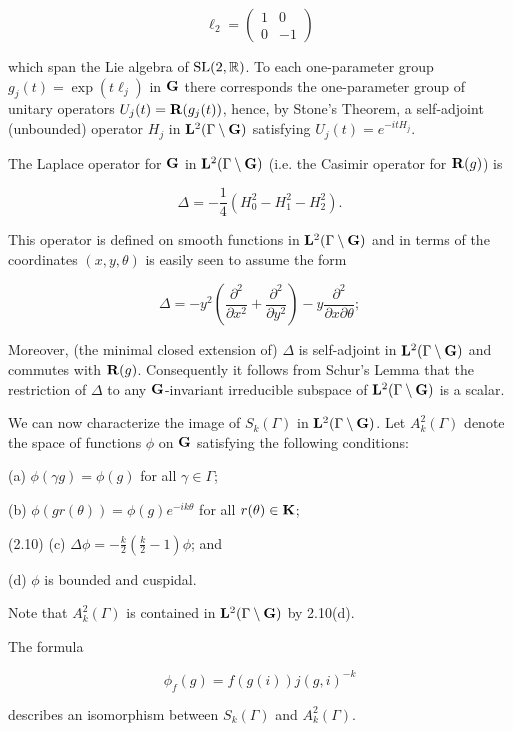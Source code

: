 \[
\ell_2 = \begin{pmatrix} 1 & 0 \\ 0 & -1 \end{pmatrix}
\]

which span the Lie algebra of $\operatorname{SL}(2,\mathbb{R})$. To each one-parameter group $g_j(t) = \exp(t\ell_j)$ in $\mathbf{G}$ there corresponds the one-parameter group of unitary operators $U_j(t) = \mathbf{R}(g_j(t))$, hence, by Stone's Theorem, a self-adjoint (unbounded) operator $H_j$ in $\mathbf{L}^2(\Gamma \setminus \mathbf{G})$ satisfying $U_j(t) = e^{-itH_j}$.

The Laplace operator for $\mathbf{G}$ in $\mathbf{L}^2(\Gamma \setminus \mathbf{G})$ (i.e. the Casimir operator for $\mathbf{R}(g)$) is

\begin{equation}\label{eq:2.8}
\Delta = -\frac{1}{4}\left(H_0^2 - H_1^2 - H_2^2\right).\tag{2.8}
\end{equation}

This operator is defined on smooth functions in $\mathbf{L}^2(\Gamma \setminus \mathbf{G})$ and in terms of the coordinates $(x, y, \theta)$ is easily seen to assume the form

\begin{equation}\label{eq:2.9}
\Delta = -y^2\left(\frac{\partial^2}{\partial x^2} + \frac{\partial^2}{\partial y^2}\right) - y \frac{\partial^2}{\partial x \partial \theta};\tag{2.9}
\end{equation}

Moreover, (the minimal closed extension of) $\Delta$ is self-adjoint in $\mathbf{L}^2(\Gamma \setminus \mathbf{G})$ and commutes with $\mathbf{R}(g)$. Consequently it follows from Schur's Lemma that the restriction of $\Delta$ to any $\mathbf{G}$-invariant irreducible subspace of $\mathbf{L}^2(\Gamma \setminus \mathbf{G})$ is a scalar.

We can now characterize the image of $S_k(\Gamma)$ in $\mathbf{L}^2(\Gamma \setminus \mathbf{G})$. Let $A_k^2(\Gamma)$ denote the space of functions $\phi$ on $\mathbf{G}$ satisfying the following conditions:

(a) $\phi(\gamma g) = \phi(g)$ for all $\gamma \in \Gamma$;

(b) $\phi(gr(\theta)) = \phi(g)e^{-ik\theta}$ for all $r(\theta) \in \mathbf{K}$;

(2.10) (c) $\Delta\phi = -\frac{k}{2}\left(\frac{k}{2} - 1\right)\phi$; and

(d) $\phi$ is bounded and cuspidal.

Note that $A_k^2(\Gamma)$ is contained in $\mathbf{L}^2(\Gamma \setminus \mathbf{G})$ by 2.10(d).

\begin{proposition}\label{prop:2.1}

The formula

\[
\phi_f(g) = f(g(i)) j(g, i)^{-k}
\]

describes an isomorphism between $S_k(\Gamma)$ and $A_k^2(\Gamma)$.

\end{proposition}

